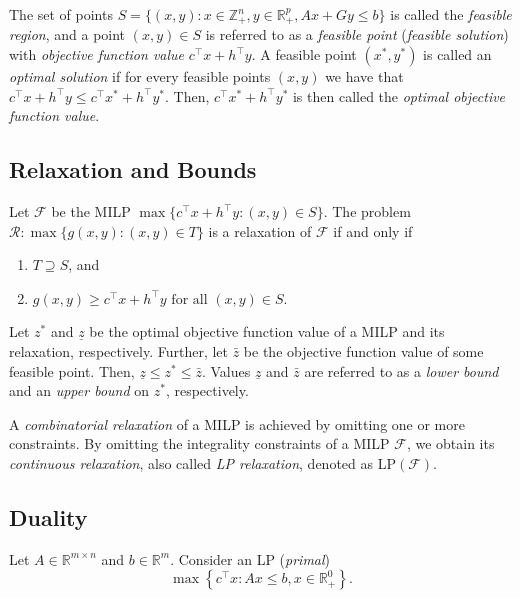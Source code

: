 The set of points $S=\{(x,y):  x \in \mathbb{Z}^{n}_+, y  \in\mathbb{R}^{p}_+, Ax + Gy \leq b\}$ is called the \emph{feasible region},  
and a point $(x,y)\in S$ is referred to as a \emph{feasible point} (\emph{feasible solution}) with \emph{objective function value} $c^\top x + h^\top y$. 
A feasible point $(x^*,y^*)$ is called an \emph{optimal solution} if for every feasible points $(x,y)$ we have that $c^\top x + h^\top y \leq c^\top x^* + h^\top y^*$. 
Then, $c^\top x^* + h^\top y^*$ is then called the \emph{optimal objective function value}. 

\subsection{Relaxation and Bounds}

\begin{definition}
	Let $\mathcal{F}$ be the MILP $\max\{c^\top x + h^\top y :(x,y)\in S\}$.
	The problem $\mathcal{R}: \max\{g(x,y):(x,y)\in T\}$ is a relaxation of $\mathcal{F}$ if and only if
	\begin{enumerate}
		\item $T\supseteq S$, and
		\item $g(x,y)\geq  c^\top x + h^\top y \text{ for all } (x,y)\in S$.
	\end{enumerate}
\end{definition}


Let $z^*$ and $\underline{z}$ be the optimal objective function value of a MILP and its relaxation, respectively. 
Further, let $\bar{z}$ be the objective function value of some feasible point.
Then, $\underline{z}\leq z^* \leq \bar{z}$.
Values $\underline{z}$ and $\bar{z}$ are referred to as a \emph{lower bound} and an \emph{upper bound} on $z^*$, respectively.

A \emph{combinatorial relaxation} of a MILP is achieved by omitting one or more constraints. 
By omitting the integrality constraints of a MILP $\mathcal{F}$, we obtain its \emph{continuous relaxation}, also called \emph{LP relaxation}, denoted as LP$(\mathcal{F})$.

\subsection{Duality}

Let $A\in \mathbb{R}^{m\times n}$ and $b\in\mathbb{R}^m$.
Consider an LP (\emph{primal})
\begin{equation}
	\max \left\{c^\top x  :  Ax \leq b, x \in\mathbb{R}_+^ 0\right\}. 
\label{eq:primal}
\end{equation}

